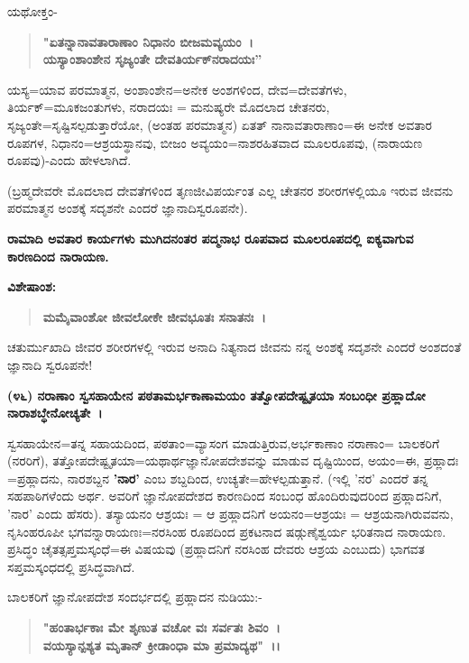 ಯಥೋಕ್ತಂ-

\begin{verse}
\textbf{"ಏತನ್ನಾನಾವತಾರಾಣಾಂ ನಿಧಾನಂ ಬೀಜಮವ್ಯಯಂ~।}\\\textbf{ಯಸ್ಯಾಂಶಾಂಶೇನ ಸೃಜ್ಯಂತೇ ದೇವತಿರ್ಯಕ್‌ನರಾದಯಃ''}
\end{verse}

ಯಸ್ಯ=ಯಾವ ಪರಮಾತ್ಮನ, ಅಂಶಾಂಶೇನ=ಅನೇಕ ಅಂಶಗಳಿಂದ, ದೇವ=ದೇವತೆಗಳು, ತಿರ್ಯಕ್=ಮೂಕಜಂತುಗಳು, ನರಾದಯಃ = ಮನುಷ್ಯರೇ ಮೊದಲಾದ ಚೇತನರು, ಸೃಜ್ಯಂತೇ=ಸೃಷ್ಟಿಸಲ್ಪಡುತ್ತಾರೆಯೋ, (ಅಂತಹ ಪರಮಾತ್ಮನ) ಏತತ್ ನಾನಾವತಾರಾಣಾಂ=ಈ ಅನೇಕ ಅವತಾರ ರೂಪಗಳ, ನಿಧಾನಂ=ಆಶ್ರಯಸ್ಥಾನವು, ಬೀಜಂ ಅವ್ಯಯಂ=ನಾಶರಹಿತ\-ವಾದ ಮೂಲರೂಪವು, (ನಾರಾಯಣ ರೂಪವು)-ಎಂದು ಹೇಳಲಾಗಿದೆ.

(ಬ್ರಹ್ಮದೇವರೇ ಮೊದಲಾದ ದೇವತೆಗಳಿಂದ ತೃಣಜೀವಿಪರ್ಯಂತ ಎಲ್ಲ ಚೇತನರ ಶರೀರಗಳಲ್ಲಿಯೂ ಇರುವ ಜೀವನು ಪರಮಾತ್ಮನ ಅಂಶಕ್ಕೆ ಸದೃಶನೇ ಎಂದರೆ ಜ್ಞಾನಾದಿ\-ಸ್ವರೂಪನೇ).

\newpage

\begin{center}
\textbf{ರಾಮಾದಿ ಅವತಾರ ಕಾರ್ಯಗಳು ಮುಗಿದನಂತರ ಪದ್ಮನಾಭ ರೂಪವಾದ ಮೂಲರೂಪದಲ್ಲಿ ಐಕ್ಯವಾಗುವ ಕಾರಣದಿಂದ ನಾರಾಯಣ.}
\end{center}

\noindent
\textbf{ವಿಶೇಷಾಂಶ:\enginline{-}}

\begin{verse}
\textbf{ಮಮೈವಾಂಶೋ ಜೀವಲೋಕೇ ಜೀವಭೂತಃ ಸನಾತನಃ~।}
\end{verse}


ಚತುರ್ಮುಖಾದಿ ಜೀವರ ಶರೀರಗಳಲ್ಲಿ ಇರುವ ಅನಾದಿ ನಿತ್ಯನಾದ ಜೀವನು ನನ್ನ ಅಂಶಕ್ಕೆ ಸದೃಶನೇ ಎಂದರೆ ಅಂಶದಂತೆ ಜ್ಞಾನಾದಿ ಸ್ವರೂಪನೇ!

\textbf{(೪೬) ನರಾಣಾಂ ಸ್ವಸಹಾಯೇನ ಪಠತಾಮರ್ಭಕಾಣಾಮಯಂ ತತ್ವೋಪದೇಷ್ಟೃತಯಾ ಸಂಬಂಧೀ ಪ್ರಹ್ಲಾದೋ ನಾರಾಶಬ್ಧೇನೋಚ್ಯತೇ~।}

ಸ್ವಸಹಾಯೇನ=ತನ್ನ ಸಹಾಯದಿಂದ, ಪಠತಾಂ=ವ್ಯಾಸಂಗ ಮಾಡುತ್ತಿರುವ,\break ಅರ್ಭಕಾಣಾಂ ನರಾಣಾಂ= ಬಾಲಕರಿಗೆ (ನರರಿಗೆ), ತತ್ತೋಪದೇಷ್ಟೃತಯಾ=ಯಥಾರ್ಥ\-ಜ್ಞಾನೋಪದೇಶವನ್ನು ಮಾಡುವ ದೃಷ್ಟಿಯಿಂದ, ಅಯಂ=ಈ, ಪ್ರಹ್ಲಾದಃ =ಪ್ರಹ್ಲಾದನು, ನಾರಶಬ್ದನ \textbf{'ನಾರ'} ಎಂಬ ಶಬ್ದದಿಂದ, ಉಚ್ಯತೇ=ಹೇಳಲ್ಪಡುತ್ತಾನೆ. (ಇಲ್ಲಿ 'ನರ' ಎಂದರೆ ತನ್ನ ಸಹಪಾಠಿಗಳೆಂದು ಅರ್ಥ. ಅವರಿಗೆ ಜ್ಞಾನೋಪದೇಶದ ಕಾರಣದಿಂದ ಸಂಬಂಧ ಹೊಂದಿರುವುದರಿಂದ ಪ್ರಹ್ಲಾದನಿಗೆ, 'ನಾರ' ಎಂದು ಹೆಸರು). ತಸ್ಯಾಯನಂ ಆಶ್ರಯಃ = ಆ ಪ್ರಹ್ಲಾದನಿಗೆ ಅಯನಂ=ಆಶ್ರಯಃ = ಆಶ್ರಯನಾಗಿರುವವನು, ನೃಸಿಂಹರೂಪೀ ಭಗವನ್ನಾರಾಯಣಃ=ನರಸಿಂಹ ರೂಪದಿಂದ ಪ್ರಕಟನಾದ ಷಡ್ಗುಣೈಶ್ವರ್ಯ ಭರಿತನಾದ ನಾರಾಯಣ. ಪ್ರಸಿದ್ಧಂ ಚೈತತ್ಸಪ್ತಮಸ್ಕಂಧೆ=ಈ ವಿಷಯವು (ಪ್ರಹ್ಲಾದನಿಗೆ ನರಸಿಂಹ ದೇವರು ಆಶ್ರಯ ಎಂಬುದು) ಭಾಗವತ ಸಪ್ತಮಸ್ಕಂಧದಲ್ಲಿ ಪ್ರಸಿದ್ಧವಾಗಿದೆ.

ಬಾಲಕರಿಗೆ ಜ್ಞಾನೋಪದೇಶ ಸಂದರ್ಭದಲ್ಲಿ ಪ್ರಹ್ಲಾದನ ನುಡಿಯು:-

\begin{verse}
\textbf{"ಹಂತಾರ್ಭಕಾಃ ಮೇ ಶೃಣುತ ವಚೋ ವಃ ಸರ್ವತಃ ಶಿವಂ~।}\\\textbf{ವಯಸ್ಯಾನ್ಪಶ್ಯತ ಮೃತಾನ್ ಕ್ರೀಡಾಂಧಾ ಮಾ ಪ್ರಮಾದ್ಯಥ"~।।}
\end{verse}

